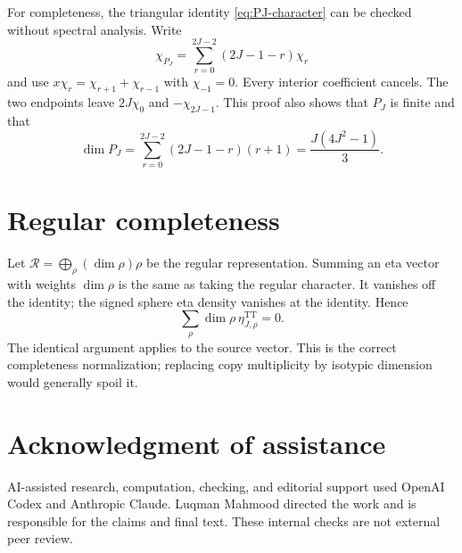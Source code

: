 \documentclass[11pt]{article}
\theoremstyle{definition}
\newcommand{\TT}{\mathrm{TT}}
\begin{document}
For completeness, the triangular identity
\eqref{eq:PJ-character} can be checked without spectral analysis.  Write
\[
 \chi_{P_J}=\sum_{r=0}^{2J-2}(2J-1-r)\chi_r
\]
and use $x\chi_r=\chi_{r+1}+\chi_{r-1}$ with $\chi_{-1}=0$.  Every interior
coefficient cancels.  The two endpoints leave $2J\chi_0$ and
$-\chi_{2J-1}$.  This proof also shows that $P_J$ is finite and that
\[
 \dim P_J=\sum_{r=0}^{2J-2}(2J-1-r)(r+1)
 =\frac{J(4J^2-1)}3.
\]

\section{Regular completeness}

Let $\mathcal R=\bigoplus_\rho(\dim\rho)\rho$ be the regular representation.
Summing an eta vector with weights $\dim\rho$ is the same as taking the
regular character.  It vanishes off the identity; the signed sphere eta
density vanishes at the identity.  Hence
\[
 \sum_\rho\dim\rho\,\eta^{\TT}_{J,\rho}=0.
\]
The identical argument applies to the source vector.  This is the correct
completeness normalization; replacing copy multiplicity by isotypic dimension
would generally spoil it.

\section*{Acknowledgment of assistance}
AI-assisted research, computation, checking, and editorial support used
OpenAI Codex and Anthropic Claude. Luqman Mahmood directed the work
and is responsible for the claims and final text. These internal
checks are not external peer review.



\end{document}
